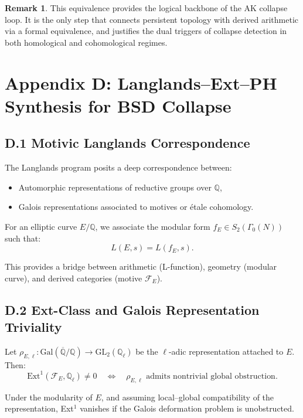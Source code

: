 \documentclass[11pt]{article}
\theoremstyle{definition}
\newtheorem{remark}[theorem]{Remark}
\begin{document}
\begin{remark}
This equivalence provides the logical backbone of the AK collapse loop.  
It is the only step that connects persistent topology with derived arithmetic via a formal equivalence,  
and justifies the dual triggers of collapse detection in both homological and cohomological regimes.
\end{remark}



\section*{Appendix D: Langlands--Ext--PH Synthesis for BSD Collapse}

\subsection*{D.1 Motivic Langlands Correspondence}

The Langlands program posits a deep correspondence between:
\begin{itemize}
  \item Automorphic representations of reductive groups over \( \mathbb{Q} \),
  \item Galois representations associated to motives or étale cohomology.
\end{itemize}

For an elliptic curve \( E/\mathbb{Q} \), we associate the modular form \( f_E \in S_2(\Gamma_0(N)) \) such that:
\[
L(E, s) = L(f_E, s).
\]

This provides a bridge between arithmetic (L-function), geometry (modular curve), and derived categories (motive \( \mathcal{F}_E \)).

\subsection*{D.2 Ext-Class and Galois Representation Triviality}

Let \( \rho_{E, \ell} : \mathrm{Gal}(\overline{\mathbb{Q}}/\mathbb{Q}) \to \mathrm{GL}_2(\mathbb{Q}_\ell) \) be the \(\ell\)-adic representation attached to \( E \).  
Then:
\[
\mathrm{Ext}^1(\mathcal{F}_E, \mathbb{Q}_\ell) \neq 0
\quad \Leftrightarrow \quad
\rho_{E,\ell} \text{ admits nontrivial global obstruction}.
\]

Under the modularity of \( E \), and assuming local–global compatibility of the representation, Ext$^1$ vanishes if the Galois deformation problem is unobstructed.
\end{document}
